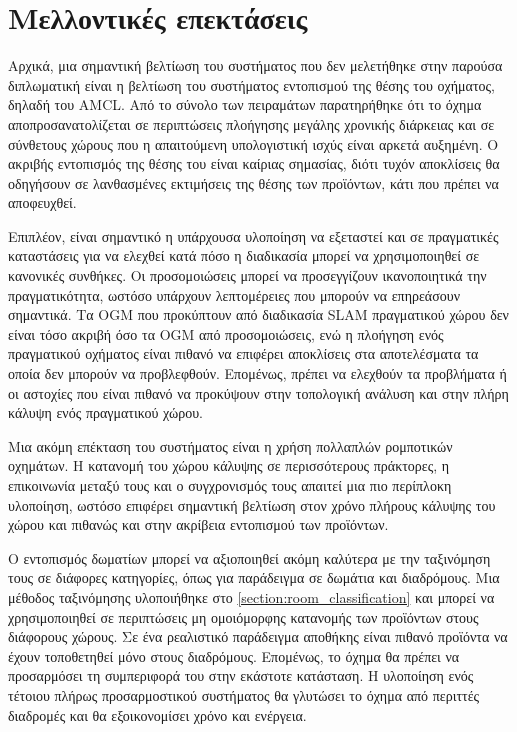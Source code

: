 \chapter{Μελλοντικές επεκτάσεις}
\label{chapter:future_work}



Αρχικά, μια σημαντική βελτίωση του συστήματος που δεν μελετήθηκε στην παρούσα διπλωματική είναι η βελτίωση του συστήματος εντοπισμού της θέσης του οχήματος, δηλαδή του AMCL. Από το σύνολο των πειραμάτων παρατηρήθηκε ότι το όχημα αποπροσανατολίζεται σε περιπτώσεις πλοήγησης μεγάλης χρονικής διάρκειας και σε σύνθετους χώρους που η απαιτούμενη υπολογιστική ισχύς είναι αρκετά αυξημένη. Ο ακριβής εντοπισμός της θέσης του είναι καίριας σημασίας, διότι τυχόν αποκλίσεις θα οδηγήσουν σε λανθασμένες εκτιμήσεις της θέσης των προϊόντων, κάτι που πρέπει να αποφευχθεί.

Επιπλέον, είναι σημαντικό η υπάρχουσα υλοποίηση να εξεταστεί και σε πραγματικές καταστάσεις για να ελεχθεί κατά πόσο η διαδικασία μπορεί να χρησιμοποιηθεί σε κανονικές συνθήκες. Οι προσομοιώσεις μπορεί να προσεγγίζουν ικανοποιητικά την πραγματικότητα, ωστόσο υπάρχουν λεπτομέρειες που μπορούν να επηρεάσουν σημαντικά. Τα OGM που προκύπτουν από διαδικασία SLAM πραγματικού χώρου δεν είναι τόσο ακριβή όσο τα OGM από προσομοιώσεις, ενώ η πλοήγηση ενός πραγματικού οχήματος είναι πιθανό να επιφέρει αποκλίσεις στα αποτελέσματα τα οποία δεν μπορούν να προβλεφθούν. Επομένως, πρέπει να ελεχθούν τα προβλήματα ή οι αστοχίες που είναι πιθανό να προκύψουν στην τοπολογική ανάλυση και στην πλήρη κάλυψη ενός πραγματικού χώρου.

Μια ακόμη επέκταση του συστήματος είναι η χρήση πολλαπλών ρομποτικών οχημάτων. Η κατανομή του χώρου κάλυψης σε περισσότερους πράκτορες, η επικοινωνία μεταξύ τους και ο συγχρονισμός τους απαιτεί μια πιο περίπλοκη υλοποίηση, ωστόσο επιφέρει σημαντική βελτίωση στον χρόνο πλήρους κάλυψης του χώρου και πιθανώς και στην ακρίβεια εντοπισμού των προϊόντων.

Ο εντοπισμός δωματίων μπορεί να αξιοποιηθεί ακόμη καλύτερα με την ταξινόμηση τους σε διάφορες κατηγορίες, όπως για παράδειγμα σε δωμάτια και διαδρόμους. Μια μέθοδος ταξινόμησης υλοποιήθηκε στο \ref{section:room_classification} και μπορεί να χρησιμοποιηθεί σε περιπτώσεις μη ομοιόμορφης κατανομής των προϊόντων στους διάφορους χώρους. Σε ένα ρεαλιστικό παράδειγμα αποθήκης είναι πιθανό προϊόντα να έχουν τοποθετηθεί μόνο στους διαδρόμους. Επομένως, το όχημα θα πρέπει να προσαρμόσει τη συμπεριφορά του στην εκάστοτε κατάσταση. Η υλοποίηση ενός τέτοιου πλήρως προσαρμοστικού συστήματος θα γλυτώσει το όχημα από περιττές διαδρομές και θα εξοικονομίσει χρόνο και ενέργεια.

